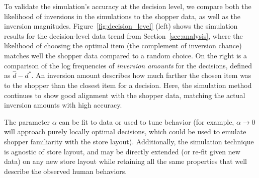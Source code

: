 \documentclass[aps,pre,twocolumn,groupedaddress]{revtex4-2}
\begin{document}
To validate the simulation's accuracy at the decision level, we compare both the likelihood of inversions in the simulations to the shopper data, as well as the inversion magnitudes.
Figure~\ref{fig:decision_level} (left) shows the simulation results for the decision-level data trend from Section~\ref{sec:analysis}, where the likelihood of choosing the optimal item (the complement of inversion chance) matches well the shopper data compared to a random choice. On the right is a comparison of the log frequencies of \textit{inversion amounts} for the decisions, defined as $\hat{d} - d^{*}$. An inversion amount describes how much farther the chosen item was to the shopper than the closest item for a decision. Here, the simulation method continues to show good alignment with the shopper data, matching the actual inversion amounts with high accuracy.

The parameter $\alpha$ can be fit to data or used to tune behavior (for example, $\alpha \rightarrow 0$ will approach purely locally optimal decisions, which could be used to emulate shopper familiarity with the store layout). Additionally, the simulation technique is agnostic of store layout, and may be directly extended (or re-fit given new data) on any new store layout while retaining all the same properties that well describe the observed human behaviors. 

\end{document}
